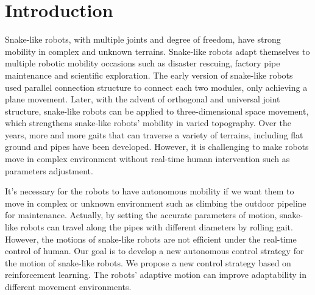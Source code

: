 \section{Introduction}
Snake-like robots, with multiple joints and degree of freedom, have strong mobility in complex and unknown terrains\cite{Chirikjian1995The}. Snake-like robots adapt themselves to multiple robotic mobility occasions such as disaster rescuing\cite{DogAndSnake}, factory pipe maintenance\cite{ACMTutorial} and scientific exploration\cite{Kuwada2007Snake}. The early version of snake-like robots used parallel connection structure to connect each two modules, only achieving a plane movement\cite{mori2002three}. Later, with the advent of orthogonal and universal joint structure\cite{1014757}\cite{Date2005Control}\cite{GaitBasedCompliant}, snake-like robots can be applied to three-dimensional space movement, which strengthens snake-like robots' mobility in varied topography. Over the years, more and more gaits that can traverse a variety of terrains, including flat ground and pipes have been developed\cite{5152862}\cite{5602354}. However, it is challenging to make robots move in complex environment without real-time human intervention such as parameters adjustment.

It's necessary for the robots to have autonomous mobility if we want them to move in complex or unknown environment such as climbing the outdoor pipeline for maintenance. Actually, by setting the accurate parameters of motion, snake-like robots can travel along the pipes with different diameters by rolling gait. However, the motions of snake-like robots are not efficient under the real-time control of human. Our goal is to develop a new autonomous control strategy for the motion of snake-like robots. We propose a new control strategy based on reinforcement learning. The robots' adaptive motion can improve adaptability in different movement environments.

